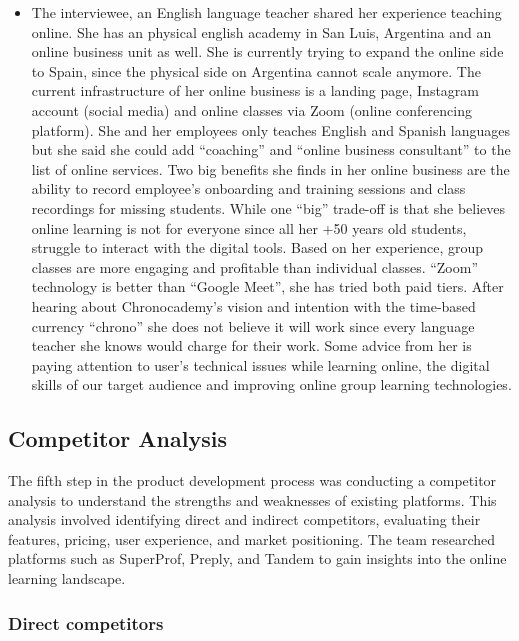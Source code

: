 \begin{itemize}
    \item The interviewee, an English language teacher shared her experience teaching online.
    She has an physical english academy in San Luis, Argentina and an online business unit as well.
    She is currently trying to expand the online side to Spain, since the physical side on Argentina cannot scale anymore.
    The current infrastructure of her online business is a landing page, Instagram account (social media) and online classes via Zoom (online conferencing platform).
    She and her employees only teaches English and Spanish languages but she said she could add ``coaching'' and ``online business consultant'' to the list of online services.
    Two big benefits she finds in her online business are the ability to record employee's onboarding and training sessions and class recordings for missing students.
    While one ``big'' trade-off is that she believes online learning is not for everyone since all her +50 years old students, struggle to interact with the digital tools.
    Based on her experience, group classes are more engaging and profitable than individual classes.
    ``Zoom'' technology is better than ``Google Meet'', she has tried both paid tiers.
    After hearing about Chronocademy's vision and intention with the time-based currency ``chrono'' she does not believe it will work since every language teacher she knows would charge for their work.
    Some advice from her is paying attention to user's technical issues while learning online, the digital skills of our target audience and improving online group learning technologies.
\end{itemize}

\newpage
\subsection{Competitor Analysis}\label{subsec:competitor-analysis}
The fifth step in the product development process was conducting a competitor analysis to understand the strengths and weaknesses of existing platforms.
This analysis involved identifying direct and indirect competitors, evaluating their features, pricing, user experience, and market positioning.
The team researched platforms such as SuperProf, Preply, and Tandem to gain insights into the online learning landscape.

\subsubsection{Direct competitors}

